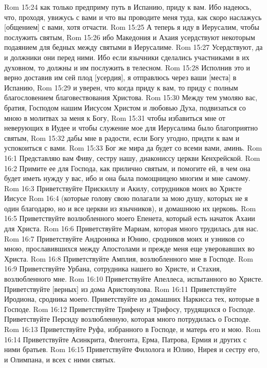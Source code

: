 Rom 15:24  как только предприму путь в Испанию, приду к вам. Ибо надеюсь, что, проходя, увижусь с вами и что вы проводите меня туда, как скоро наслажусь [общением] с вами, хотя отчасти.
Rom 15:25  А теперь я иду в Иерусалим, чтобы послужить святым,
Rom 15:26  ибо Македония и Ахаия усердствуют некоторым подаянием для бедных между святыми в Иерусалиме.
Rom 15:27  Усердствуют, да и должники они перед ними. Ибо если язычники сделались участниками в их духовном, то должны и им послужить в телесном.
Rom 15:28  Исполнив это и верно доставив им сей плод [усердия], я отправлюсь через ваши [места] в Испанию,
Rom 15:29  и уверен, что когда приду к вам, то приду с полным благословением благовествования Христова.
Rom 15:30  Между тем умоляю вас, братия, Господом нашим Иисусом Христом и любовью Духа, подвизаться со мною в молитвах за меня к Богу,
Rom 15:31  чтобы избавиться мне от неверующих в Иудее и чтобы служение мое для Иерусалима было благоприятно святым,
Rom 15:32  дабы мне в радости, если Богу угодно, придти к вам и успокоиться с вами.
Rom 15:33  Бог же мира да будет со всеми вами, аминь.
Rom 16:1  Представляю вам Фиву, сестру нашу, диакониссу церкви Кенхрейской.
Rom 16:2  Примите ее для Господа, как прилично святым, и помогите ей, в чем она будет иметь нужду у вас, ибо и она была помощницею многим и мне самому.
Rom 16:3  Приветствуйте Прискиллу и Акилу, сотрудников моих во Христе Иисусе
Rom 16:4  (которые голову свою полагали за мою душу, которых не я один благодарю, но и все церкви из язычников), и домашнюю их церковь.
Rom 16:5  Приветствуйте возлюбленного моего Епенета, который есть начаток Ахаии для Христа.
Rom 16:6  Приветствуйте Мариам, которая много трудилась для нас.
Rom 16:7  Приветствуйте Андроника и Юнию, сродников моих и узников со мною, прославившихся между Апостолами и прежде меня еще уверовавших во Христа.
Rom 16:8  Приветствуйте Амплия, возлюбленного мне в Господе.
Rom 16:9  Приветствуйте Урбана, сотрудника нашего во Христе, и Стахия, возлюбленного мне.
Rom 16:10  Приветствуйте Апеллеса, испытанного во Христе. Приветствуйте [верных] из дома Аристовулова.
Rom 16:11  Приветствуйте Иродиона, сродника моего. Приветствуйте из домашних Наркисса тех, которые в Господе.
Rom 16:12  Приветствуйте Трифену и Трифосу, трудящихся о Господе. Приветствуйте Персиду возлюбленную, которая много потрудилась о Господе.
Rom 16:13  Приветствуйте Руфа, избранного в Господе, и матерь его и мою.
Rom 16:14  Приветствуйте Асинкрита, Флегонта, Ерма, Патрова, Ермия и других с ними братьев.
Rom 16:15  Приветствуйте Филолога и Юлию, Нирея и сестру его, и Олимпана, и всех с ними святых.
